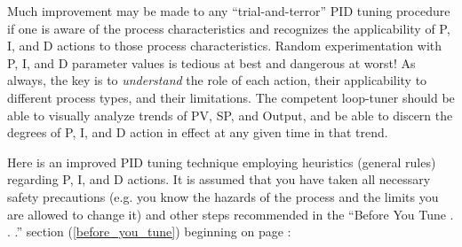 Much improvement may be made to any ``trial-and-terror'' PID tuning procedure if one is aware of the process characteristics and recognizes the applicability of P, I, and D actions to those process characteristics.  Random experimentation with P, I, and D parameter values is tedious at best and dangerous at worst!  As always, the key is to \textit{understand} the role of each action, their applicability to different process types, and their limitations.  The competent loop-tuner should be able to visually analyze trends of PV, SP, and Output, and be able to discern the degrees of P, I, and D action in effect at any given time in that trend.

\filbreak

Here is an improved PID tuning technique employing heuristics (general rules) regarding P, I, and D actions.  It is assumed that you have taken all necessary safety precautions (e.g. you know the hazards of the process and the limits you are allowed to change it) and other steps recommended in the ``Before You Tune . . .'' section (\ref{before_you_tune}) beginning on page \pageref{before_you_tune}:

